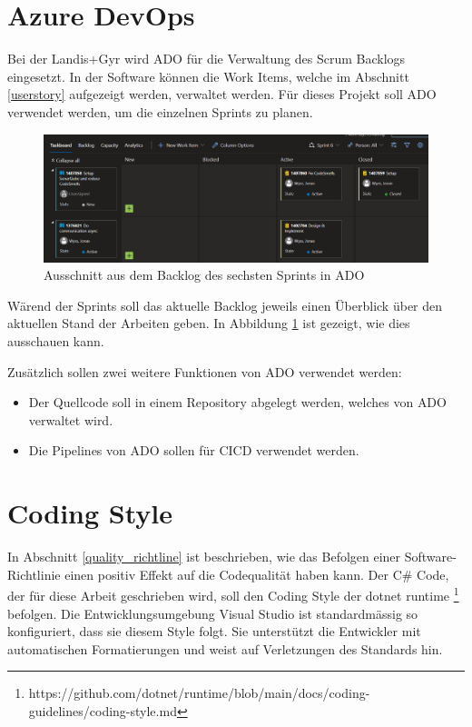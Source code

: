 \section{Azure DevOps}\label{methoden:ADO}
Bei der Landis+Gyr wird \ac{ADO} für die Verwaltung des Scrum Backlogs eingesetzt.
In der Software können die Work Items, welche im Abschnitt \ref{userstory} aufgezeigt werden, verwaltet werden.
Für dieses Projekt soll \ac{ADO} verwendet werden, um die einzelnen Sprints zu planen.
\begin{figure}[H]
   \centering
   \includegraphics[width=1.0\textwidth]{gfx/ado.png}
   \caption{
         Ausschnitt aus dem Backlog des sechsten Sprints in \ac{ADO}
      }
      \label{fig:adosprint6}
\end{figure}
Wärend der Sprints soll das aktuelle Backlog jeweils einen Überblick über den aktuellen Stand der Arbeiten geben.
In Abbildung \ref{fig:adosprint6} ist gezeigt, wie dies ausschauen kann.

Zusätzlich sollen zwei weitere Funktionen von \ac{ADO} verwendet werden:
\begin{itemize}
   \item Der Quellcode soll in einem Repository abgelegt werden, welches von \ac{ADO} verwaltet wird.
   \item Die Pipelines von \ac{ADO} sollen für \ac{CICD} verwendet werden.
\end{itemize}

\section{Coding Style}\label{codingStandard}
In Abschnitt \ref{quality_richtline} ist beschrieben, wie das Befolgen einer Software-Richtlinie einen positiv Effekt auf die Codequalität haben kann.
Der C\# Code, der für diese Arbeit geschrieben wird, soll den Coding Style der dotnet runtime \footnote{https://github.com/dotnet/runtime/blob/main/docs/coding-guidelines/coding-style.md} befolgen.
Die Entwicklungsumgebung Visual Studio ist standardmässig so konfiguriert, dass sie diesem Style folgt.
Sie unterstützt die Entwickler mit automatischen Formatierungen und weist auf Verletzungen des Standards hin.

